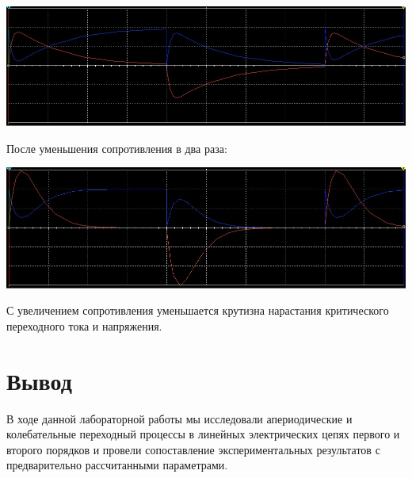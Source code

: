 \documentclass[14pt, a4paper]{article}
\begin{document}
        {
                \includegraphics[width=1\textwidth]{OSC_Aperiod.jpg}
        }

        После уменьшения сопротивления в два раза:

        {
                \includegraphics[width=1\textwidth]{OSC_Aperiod50.jpg}
        }

        С увеличением сопротивления уменьшается крутизна нарастания критического переходного тока и напряжения. 

    \section*{Вывод}

        В ходе данной лабораторной работы мы исследовали апериодические и колебательные 
        переходный процессы в линейных электрических цепях первого и второго
        порядков и провели сопоставление экспериментальных результатов с предварительно
        рассчитанными параметрами.
\end{document}
